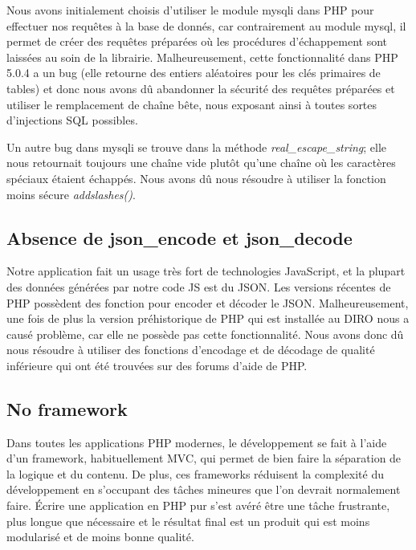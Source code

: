 \documentclass[10pt]{article}
\begin{document}
Nous avons initialement choisis d'utiliser le module mysqli dans PHP
pour effectuer nos requêtes à la base de donnés, car contrairement au
module mysql, il permet de créer des requêtes préparées où les
procédures d'échappement sont laissées au soin de la librairie.
Malheureusement, cette fonctionnalité dans PHP 5.0.4 a un bug (elle
retourne des entiers aléatoires pour les clés primaires de tables) et
donc nous avons dû abandonner la sécurité des requêtes préparées et
utiliser le remplacement de chaîne bête, nous exposant ainsi à toutes
sortes d'injections SQL possibles.

Un autre bug dans mysqli se trouve dans la méthode {\em
  real\_escape\_string}; elle nous retournait toujours une chaîne vide
plutôt qu'une chaîne où les caractères spéciaux étaient échappés. Nous
avons dû nous résoudre à utiliser la fonction moins sécure {\em
  addslashes()}.

\subsection{Absence de json\_encode et json\_decode}

Notre application fait un usage très fort de technologies JavaScript,
et la plupart des données générées par notre code JS est du JSON. Les
versions récentes de PHP possèdent des fonction pour encoder et
décoder le JSON. Malheureusement, une fois de plus la version
préhistorique de PHP qui est installée au DIRO nous a causé problème,
car elle ne possède pas cette fonctionnalité. Nous avons donc dû nous
résoudre à utiliser des fonctions d'encodage et de décodage de qualité
inférieure qui ont été trouvées sur des forums d'aide de PHP.

\subsection{No framework}

Dans toutes les applications PHP modernes, le développement se fait à
l'aide d'un framework, habituellement MVC, qui permet de bien faire la
séparation de la logique et du contenu.  De plus, ces frameworks
réduisent la complexité du développement en s'occupant des tâches
mineures que l'on devrait normalement faire.  Écrire une application
en PHP pur s'est avéré être une tâche frustrante, plus longue que
nécessaire et le résultat final est un produit qui est moins
modularisé et de moins bonne qualité.
\end{document}
